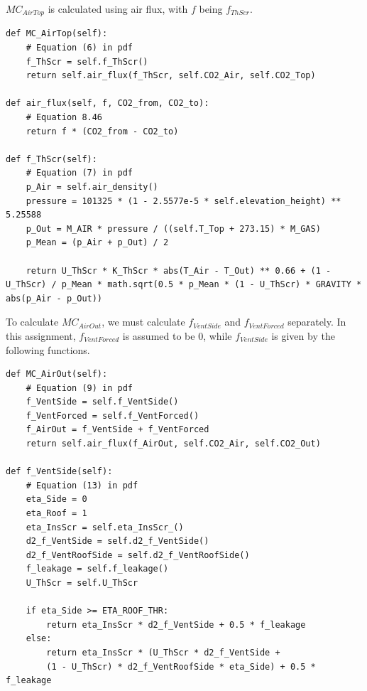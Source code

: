 \documentclass[a4paper]{article}
\numberwithin{equation}{section}
\begin{document}
\( MC_{AirTop} \) is calculated using air flux, with \( f \) being \( f_{ThScr} \).
\begin{mdframed}[leftline=false,rightline=false,backgroundcolor=magenta!10,nobreak=true]
  \begin{verbatim}
def MC_AirTop(self):
    # Equation (6) in pdf
    f_ThScr = self.f_ThScr()
    return self.air_flux(f_ThScr, self.CO2_Air, self.CO2_Top)
    
def air_flux(self, f, CO2_from, CO2_to):
    # Equation 8.46
    return f * (CO2_from - CO2_to)
    
def f_ThScr(self):
    # Equation (7) in pdf
    p_Air = self.air_density()
    pressure = 101325 * (1 - 2.5577e-5 * self.elevation_height) ** 5.25588
    p_Out = M_AIR * pressure / ((self.T_Top + 273.15) * M_GAS)
    p_Mean = (p_Air + p_Out) / 2

    return U_ThScr * K_ThScr * abs(T_Air - T_Out) ** 0.66 + (1 - U_ThScr) / p_Mean * math.sqrt(0.5 * p_Mean * (1 - U_ThScr) * GRAVITY * abs(p_Air - p_Out))
  \end{verbatim}
\end{mdframed}

To calculate \( MC_{AirOut} \), we must calculate \( f_{VentSide} \) and \( f_{VentForced} \) separately.
In this assignment, \( f_{VentForced} \) is assumed to be 0, while \( f_{VentSide} \) is given by the following functions.

\begin{mdframed}[leftline=false,rightline=false,backgroundcolor=magenta!10,nobreak=true]
  \begin{verbatim}
def MC_AirOut(self):
    # Equation (9) in pdf
    f_VentSide = self.f_VentSide()
    f_VentForced = self.f_VentForced()
    f_AirOut = f_VentSide + f_VentForced
    return self.air_flux(f_AirOut, self.CO2_Air, self.CO2_Out)
    
def f_VentSide(self):
    # Equation (13) in pdf
    eta_Side = 0
    eta_Roof = 1
    eta_InsScr = self.eta_InsScr_()
    d2_f_VentSide = self.d2_f_VentSide()
    d2_f_VentRoofSide = self.d2_f_VentRoofSide()
    f_leakage = self.f_leakage()
    U_ThScr = self.U_ThScr

    if eta_Side >= ETA_ROOF_THR:
        return eta_InsScr * d2_f_VentSide + 0.5 * f_leakage
    else:
        return eta_InsScr * (U_ThScr * d2_f_VentSide + 
        (1 - U_ThScr) * d2_f_VentRoofSide * eta_Side) + 0.5 * f_leakage
  \end{verbatim}
\end{mdframed}
\end{document}
